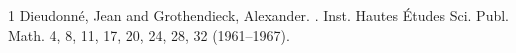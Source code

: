 \begin{thebibliography}{1}
Dieudonn{\'e}, Jean and Grothendieck, Alexander.
.
\newblock Inst. Hautes {\'E}tudes Sci. Publ. Math. 4, 8, 11, 17, 20, 24, 28, 32 (1961--1967).
\end{thebibliography}
